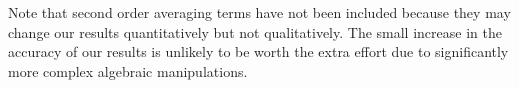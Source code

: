 
Note that second order averaging terms have not been included because they may change our results quantitatively but not qualitatively. The small increase in the accuracy of our results is unlikely to be worth the extra effort due to significantly more complex algebraic manipulations.

